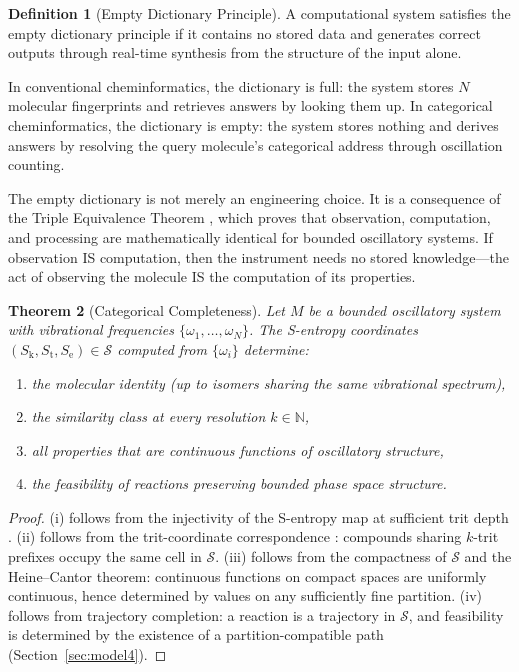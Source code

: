 \documentclass[11pt,twocolumn,a4paper]{article}
\newtheorem{theorem}{Theorem}[section]
\theoremstyle{definition}
\newtheorem{definition}[theorem]{Definition}
\theoremstyle{remark}
\newcommand{\Sk}{S_{\mathrm{k}}}
\newcommand{\St}{S_{\mathrm{t}}}
\newcommand{\Se}{S_{\mathrm{e}}}
\newcommand{\Sspace}{\mathcal{S}}
\newcommand{\Natural}{\mathbb{N}}
\begin{document}
\begin{definition}[Empty Dictionary Principle]
\label{def:empty_dict}
A computational system satisfies the empty dictionary principle if it contains no stored data and generates correct outputs through real-time synthesis from the structure of the input alone.
\end{definition}

In conventional cheminformatics, the dictionary is full: the system stores $N$ molecular fingerprints and retrieves answers by looking them up. In categorical cheminformatics, the dictionary is empty: the system stores nothing and derives answers by resolving the query molecule's categorical address through oscillation counting.

The empty dictionary is not merely an engineering choice. It is a consequence of the Triple Equivalence Theorem \citep{sachikonye2025a}, which proves that observation, computation, and processing are mathematically identical for bounded oscillatory systems. If observation IS computation, then the instrument needs no stored knowledge---the act of observing the molecule IS the computation of its properties.

\begin{theorem}[Categorical Completeness]
\label{thm:completeness}
Let $M$ be a bounded oscillatory system with vibrational frequencies $\{\omega_1, \ldots, \omega_N\}$. The S-entropy coordinates $(\Sk, \St, \Se) \in \Sspace$ computed from $\{\omega_i\}$ determine:
\begin{enumerate}[nosep]
\item[(i)] the molecular identity (up to isomers sharing the same vibrational spectrum),
\item[(ii)] the similarity class at every resolution $k \in \Natural$,
\item[(iii)] all properties that are continuous functions of oscillatory structure,
\item[(iv)] the feasibility of reactions preserving bounded phase space structure.
\end{enumerate}
\end{theorem}

\begin{proof}
(i) follows from the injectivity of the S-entropy map at sufficient trit depth \citep[Theorem~5.1]{sachikonye2025c}. (ii) follows from the trit-coordinate correspondence \citep[Theorem~4.1]{sachikonye2025c}: compounds sharing $k$-trit prefixes occupy the same cell in $\Sspace$. (iii) follows from the compactness of $\Sspace$ and the Heine--Cantor theorem: continuous functions on compact spaces are uniformly continuous, hence determined by values on any sufficiently fine partition. (iv) follows from trajectory completion: a reaction is a trajectory in $\Sspace$, and feasibility is determined by the existence of a partition-compatible path (Section~\ref{sec:model4}).
\end{proof}
\end{document}
